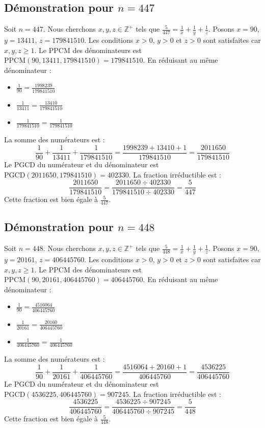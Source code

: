 \documentclass[11pt,a4paper]{article}
\begin{document}
\subsection{Démonstration pour $n = 447$}
Soit $n = 447$. Nous cherchons $x, y, z \in \mathbb{Z}^{+}$ tels que $\frac{5}{447} = \frac{1}{x} + \frac{1}{y} + \frac{1}{z}$.
Posons $x = 90$, $y = 13411$, $z = 179841510$.
Les conditions $x > 0$, $y > 0$ et $z > 0$ sont satisfaites car $x, y, z \geq 1$.
Le PPCM des dénominateurs est $\text{PPCM}(90, 13411, 179841510) = 179841510$.
En réduisant au même dénominateur :
\begin{itemize}
    \item $\frac{1}{90} = \frac{1998239}{179841510}$
    \item $\frac{1}{13411} = \frac{13410}{179841510}$
    \item $\frac{1}{179841510} = \frac{1}{179841510}$
\end{itemize}
La somme des numérateurs est :
$$ \frac{1}{90} + \frac{1}{13411} + \frac{1}{179841510} = \frac{1998239 + 13410 + 1}{179841510} = \frac{2011650}{179841510} $$
Le PGCD du numérateur et du dénominateur est $\text{PGCD}(2011650, 179841510) = 402330$.
La fraction irréductible est :
$$ \frac{2011650}{179841510} = \frac{2011650 \div 402330}{179841510 \div 402330} = \frac{5}{447} $$
Cette fraction est bien égale à $\frac{5}{447}$.

\subsection{Démonstration pour $n = 448$}
Soit $n = 448$. Nous cherchons $x, y, z \in \mathbb{Z}^{+}$ tels que $\frac{5}{448} = \frac{1}{x} + \frac{1}{y} + \frac{1}{z}$.
Posons $x = 90$, $y = 20161$, $z = 406445760$.
Les conditions $x > 0$, $y > 0$ et $z > 0$ sont satisfaites car $x, y, z \geq 1$.
Le PPCM des dénominateurs est $\text{PPCM}(90, 20161, 406445760) = 406445760$.
En réduisant au même dénominateur :
\begin{itemize}
    \item $\frac{1}{90} = \frac{4516064}{406445760}$
    \item $\frac{1}{20161} = \frac{20160}{406445760}$
    \item $\frac{1}{406445760} = \frac{1}{406445760}$
\end{itemize}
La somme des numérateurs est :
$$ \frac{1}{90} + \frac{1}{20161} + \frac{1}{406445760} = \frac{4516064 + 20160 + 1}{406445760} = \frac{4536225}{406445760} $$
Le PGCD du numérateur et du dénominateur est $\text{PGCD}(4536225, 406445760) = 907245$.
La fraction irréductible est :
$$ \frac{4536225}{406445760} = \frac{4536225 \div 907245}{406445760 \div 907245} = \frac{5}{448} $$
Cette fraction est bien égale à $\frac{5}{448}$.
\end{document}
